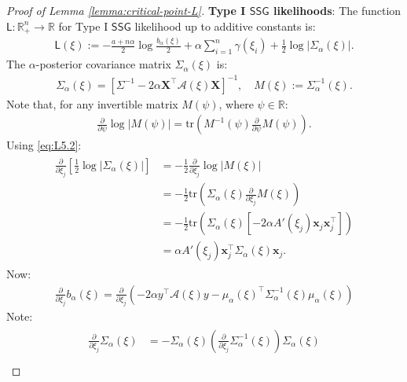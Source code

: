 \documentclass[12pt]{article}
\numberwithin{equation}{section}
\begin{document}
\begin{proof}[Proof of Lemma \ref{lemma:critical-point-L}]

\noindent

\textbf{Type I $\mathsf{SSG}$ likelihoods}: The function $\mathsf{L}:\mathbb{R}_{+}^{n}\to \mathbb{R}$ for Type I $\mathsf{SSG}$ likelihood up to additive constants is:
\begin{align}\label{eq:f-Type-I}
    \mathsf{L}(\xi) := -\frac{a+n\alpha}{2}\log \frac{b_{\alpha}(\xi)}{2} + \alpha\sum_{i=1}^{n}\gamma(\xi_i) + \frac{1}{2}\log |\Sigma_{\alpha}(\xi)|.
\end{align}
The $\alpha$-posterior covariance matrix $\Sigma_{\alpha}(\xi)$ is:
\begin{align}\label{eq:L5.1}
    \Sigma_{\alpha}(\xi) = \left[\Sigma^{-1} - 2\alpha \mathbf{X}^{\top}\mathcal{A}(\xi)\mathbf{X}\right]^{-1},\quad M(\xi) := \Sigma_{\alpha}^{-1}(\xi).
\end{align}
Note that, for any invertible matrix $M(\psi)$, where $\psi\in \mathbb{R}$:
\begin{align}\label{eq:L5.2}
    \frac{\partial}{\partial \psi}\log |M(\psi)| = \mathrm{tr}\left(M^{-1}(\psi)\frac{\partial}{\partial \psi}M(\psi)\right).
\end{align}
Using \eqref{eq:L5.2}:
\begin{align}\label{eq:L5.3}
\begin{split}
    \frac{\partial}{\partial \xi_j}\left[\frac{1}{2}\log |\Sigma_{\alpha}(\xi)|\right] &=  -\frac{1}{2}\frac{\partial}{\partial \xi_j}\log|M(\xi)|\\
    &= -\frac{1}{2}\mathrm{tr}\left(\Sigma_{\alpha}(\xi)\frac{\partial}{\partial \xi_j}M(\xi)\right)\\
    &= -\frac{1}{2}\mathrm{tr}\left(\Sigma_{\alpha}(\xi)\left[-2\alpha A'(\xi_j)\mathbf{x}_j\mathbf{x}_{j}^{\top}\right]\right)\\
    &= \alpha A'(\xi_j)\mathbf{x}_j^{\top}\Sigma_{\alpha}(\xi)\mathbf{x}_j.
\end{split}
\end{align}
Now:
\begin{align}\label{eq:L5.4}
    \frac{\partial}{\partial \xi_j}b_{\alpha}(\xi) = \frac{\partial}{\partial \xi_j}\left(-2\alpha y^{\top}\mathcal{A}(\xi) y - \mu_{\alpha}(\xi)^{\top}\Sigma_{\alpha}^{-1}(\xi)\mu_{\alpha}(\xi)\right)
\end{align}
Note:
\begin{align}\label{eq:L5.5}
\begin{split}
    \frac{\partial}{\partial \xi_j}\Sigma_{\alpha}(\xi) &= -\Sigma_{\alpha}(\xi)\left(\frac{\partial}{\partial \xi_j}\Sigma_{\alpha}^{-1}(\xi)\right)\Sigma_{\alpha}(\xi)\\

\end{split}
\end{align}
\end{proof}
\end{document}

